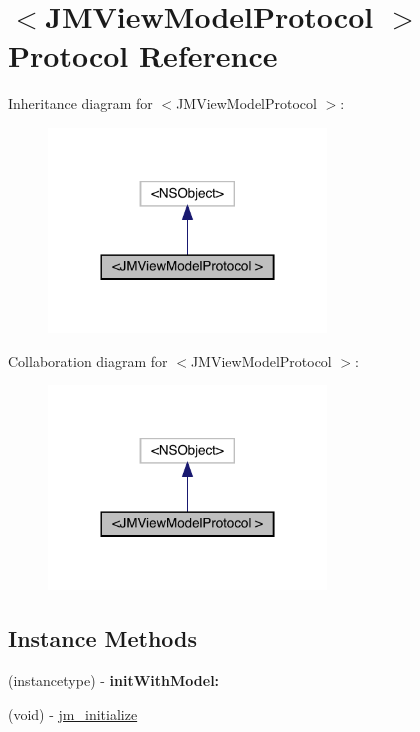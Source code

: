 \hypertarget{protocol_j_m_view_model_protocol_01-p}{}\section{$<$J\+M\+View\+Model\+Protocol $>$ Protocol Reference}
\label{protocol_j_m_view_model_protocol_01-p}


Inheritance diagram for $<$J\+M\+View\+Model\+Protocol $>$\+:\nopagebreak
\begin{figure}[H]
\begin{center}
\leavevmode
\includegraphics[width=209pt]{protocol_j_m_view_model_protocol_01-p__inherit__graph}
\end{center}
\end{figure}


Collaboration diagram for $<$J\+M\+View\+Model\+Protocol $>$\+:\nopagebreak
\begin{figure}[H]
\begin{center}
\leavevmode
\includegraphics[width=209pt]{protocol_j_m_view_model_protocol_01-p__coll__graph}
\end{center}
\end{figure}
\subsection*{Instance Methods}
\begin{DoxyCompactItemize}
\item 
\mbox{\label{protocol_j_m_view_model_protocol_01-p_a52434641f33e47c106b04ee58dc983cc}} 
(instancetype) -\/ {\bfseries init\+With\+Model\+:}
\item 
(void) -\/ \mbox{\hyperlink{protocol_j_m_view_model_protocol_01-p_aa6bc1ad6e63bfd1d8d84526804a62b20}{jm\+\_\+initialize}}
\end{DoxyCompactItemize}


